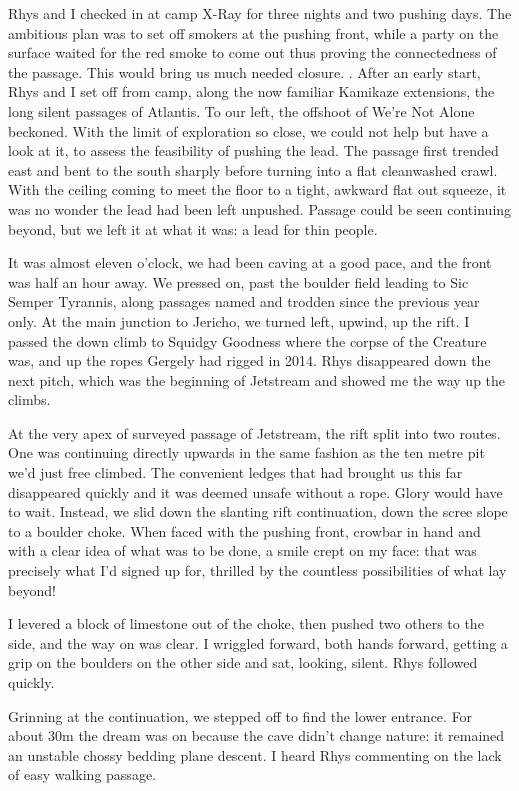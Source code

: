 \documentclass[onecolumn]{book}
\begin{document}
Rhys and I checked in at camp X-Ray for three nights and two pushing days. The ambitious plan was to set off smokers at the pushing front, while a party on the surface waited for the red smoke to come out thus proving the connectedness of the passage. This would bring us much needed closure.
	. 
After an early start, Rhys and I set off  from camp, along the now familiar Kamikaze extensions, the long silent passages of Atlantis. To our left, the offshoot of We're Not Alone beckoned. With the limit of exploration so close, we could not help but have a look at it, to assess the feasibility of pushing the lead. The passage first trended east and bent to the south sharply before turning into a flat cleanwashed crawl. With the ceiling coming to meet the floor to a tight, awkward flat out squeeze, it was no wonder the lead had been left unpushed. Passage could be seen continuing beyond, but we left it at what it was: a lead for thin people. 

It was almost eleven o'clock, we had been caving at a good pace, and the front was half an hour away. We pressed on, past the boulder field leading to Sic Semper Tyrannis, along passages named and trodden since the previous year only. At the main junction to Jericho, we turned left, upwind, up the rift. I passed the down climb to Squidgy Goodness where the corpse of the Creature was, and up the ropes Gergely had rigged in 2014. Rhys disappeared down the next pitch, which was the beginning of Jetstream and showed me the way up the climbs. 

At the very apex of surveyed passage of Jetstream, the rift split into two routes. One was continuing directly upwards in the same fashion as the ten metre pit we'd just free climbed. The convenient ledges that had brought us this far disappeared quickly and it was deemed unsafe without a rope. Glory would have to wait. Instead, we slid down the slanting rift continuation, down the scree slope to a boulder choke. When faced with the pushing front, crowbar in hand and with a clear idea of what was to be done, a smile crept on my face: that was precisely what I'd signed up for, thrilled by the countless possibilities of what lay beyond!

I levered a block of limestone out of the choke, then pushed two others to the side, and the way on was clear. I wriggled forward, both hands forward, getting a grip on the boulders on the other side and sat, looking, silent. Rhys followed quickly.

Grinning at the continuation, we stepped off to find the lower entrance. For about 30m the dream was on because the cave didn't change nature: it remained an unstable chossy bedding plane descent. I heard Rhys commenting on the lack of easy walking passage.
\end{document}
